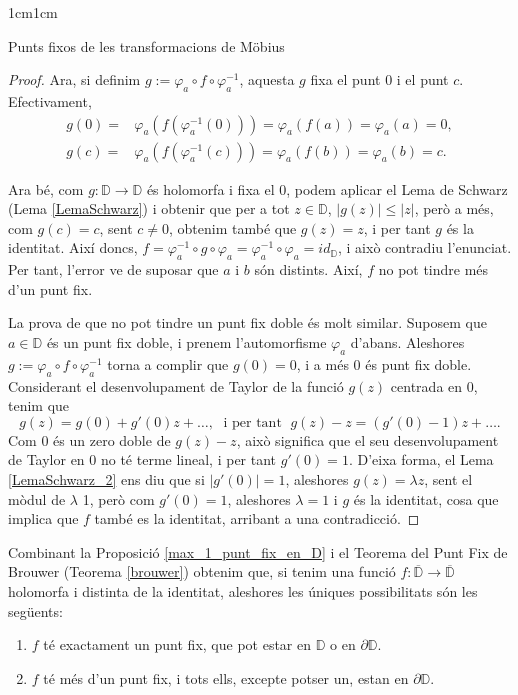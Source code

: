 \begin{adjustwidth}{1cm}{1cm}
\begin{subsection}{Punts fixos de les transformacions de Möbius}
\begin{proof}
    Ara, si definim $g:=\varphi_a\circ f\circ \varphi^{-1}_a$, aquesta $g$ fixa el punt $0$ i el punt $c$. Efectivament, 
    \begin{equation}
        \begin{aligned}
            g(0) =& \varphi_a(f(\varphi^{-1}_a(0)))=\varphi_a(f(a))=\varphi_a(a)=0, \\
            g(c) =& \varphi_a(f(\varphi^{-1}_a(c)))=\varphi_a(f(b))=\varphi_a(b)=c.
        \end{aligned}
    \end{equation}

    Ara bé, com $g:\mathbb{D}\to \mathbb{D}$ és holomorfa i fixa el $0$, podem aplicar el Lema de Schwarz (Lema \ref{LemaSchwarz}) i obtenir que per a tot $z\in \mathbb{D}$, $|g(z)|\leq|z|$, però a més, com $g(c)=c$, sent $c\neq 0$, obtenim també que $g(z)=z$, i per tant $g$ és la identitat. Així doncs, $f=\varphi^{-1}_a\circ g\circ\varphi_a=\varphi^{-1}_a\circ\varphi_a=id_{\mathbb{D}}$, i això contradiu l'enunciat. Per tant, l'error ve de suposar que $a$ i $b$ són distints. Així, $f$ no pot tindre més d'un punt fix.

    La prova de que no pot tindre un punt fix doble és molt similar. Suposem que $a\in \mathbb{D}$ és un punt fix doble, i prenem l'automorfisme $\varphi_a$ d'abans. Aleshores $g:=\varphi_a\circ f\circ \varphi^{-1}_a$ torna a complir que $g(0)=0$, i a més $0$ és punt fix doble. Considerant el desenvolupament de Taylor de la funció $g(z)$ centrada en 0, tenim que 
    \[
        g(z)=g(0)+g'(0)z+\dots, \; \text{ i per tant } \; g(z)-z=(g'(0)-1)z+\dots.
    \]
    Com $0$ és un zero doble de $g(z)-z$, això significa que el seu desenvolupament de Taylor en 0 no té terme lineal, i per tant $g'(0)=1$. D'eixa forma, el Lema \ref{LemaSchwarz_2} ens diu que si $|g'(0)|=1$, aleshores $g(z)=\lambda z$, sent el mòdul de $\lambda$ 1, però com $g'(0)=1$, aleshores $\lambda=1$ i $g$ és la identitat, cosa que implica que $f$ també es la identitat, arribant a una contradicció.
\end{proof}

\begin{nota}
    Combinant la Proposició \ref{max_1_punt_fix_en_D} i el Teorema del Punt Fix de Brouwer (Teorema \ref{brouwer}) obtenim que, si tenim una funció $f:\overline{\mathbb{D}}\to\overline{\mathbb{D}}$ holomorfa i distinta de la identitat, aleshores les úniques possibilitats són les següents:
    \begin{enumerate}
        \item $f$ té exactament un punt fix, que pot estar en $\mathbb{D}$ o en $\partial \mathbb{D}$.
        \item $f$ té més d'un punt fix, i tots ells, excepte potser un, estan en $\partial \mathbb{D}$.
    \end{enumerate}
    \label{nota_ubicacio_pf_1}
\end{nota}


\end{subsection}
\end{adjustwidth}
